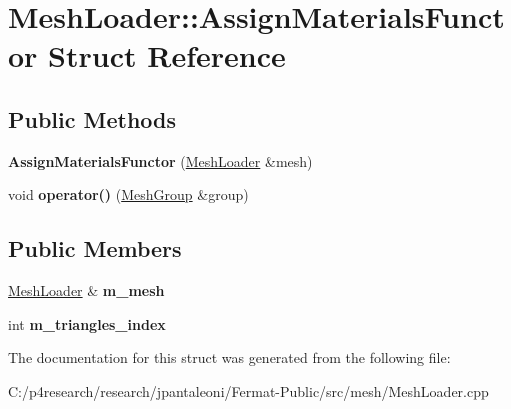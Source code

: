 \hypertarget{struct_mesh_loader_1_1_assign_materials_functor}{}\section{Mesh\+Loader\+:\+:Assign\+Materials\+Functor Struct Reference}
\label{struct_mesh_loader_1_1_assign_materials_functor}
\subsection*{Public Methods}
\begin{DoxyCompactItemize}
\item 
\mbox{\label{struct_mesh_loader_1_1_assign_materials_functor_ab707f7519d7d347a2d03e6fe6ed046db}} 
{\bfseries Assign\+Materials\+Functor} (\hyperlink{class_mesh_loader}{Mesh\+Loader} \&mesh)
\item 
\mbox{\label{struct_mesh_loader_1_1_assign_materials_functor_a405da29196e705cff7e0f8e1f825a8a2}} 
void {\bfseries operator()} (\hyperlink{class_mesh_group}{Mesh\+Group} \&group)
\end{DoxyCompactItemize}
\subsection*{Public Members}
\begin{DoxyCompactItemize}
\item 
\mbox{\label{struct_mesh_loader_1_1_assign_materials_functor_ae4b19d95e719063e28fe98ca26568226}} 
\hyperlink{class_mesh_loader}{Mesh\+Loader} \& {\bfseries m\+\_\+mesh}
\item 
\mbox{\label{struct_mesh_loader_1_1_assign_materials_functor_ab3c247a7f192bf837371d487edf65895}} 
int {\bfseries m\+\_\+triangles\+\_\+index}
\end{DoxyCompactItemize}


The documentation for this struct was generated from the following file\+:\begin{DoxyCompactItemize}
\item 
C\+:/p4research/research/jpantaleoni/\+Fermat-\/\+Public/src/mesh/Mesh\+Loader.\+cpp\end{DoxyCompactItemize}

